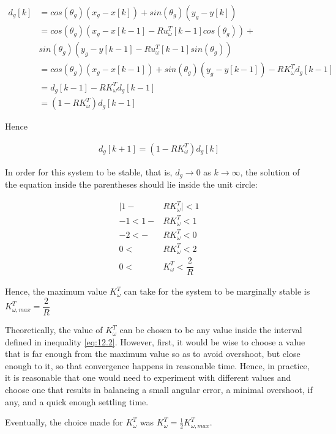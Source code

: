 \begin{align*}
  d_g[k] &= cos(\theta_g) (x_g - x[k]) + sin(\theta_g) (y_g - y[k]) \\
         &= cos(\theta_g) (x_g - x[k-1] - R u_{\omega}^T[k-1] cos(\theta_g)) + \\
         &  sin(\theta_g) (y_g - y[k-1] - R u_{\omega}^T[k-1] sin(\theta_g)) \\
         &= cos(\theta_g) (x_g - x[k-1]) + sin(\theta_g) (y_g - y[k-1]) -R K_{\omega}^T d_g[k-1]  \\
         &= d_g[k-1] - R K_{\omega}^T d_g[k-1]  \\
         &= (1-R K_{\omega}^T)d_g[k-1]
\end{align*}

Hence

\begin{align*}
  d_g[k+1]= (1-R K_{\omega}^T)d_g[k]
\end{align*}

In order for this system to be stable, that is, $d_g \to 0$ as $k \to \infty$,
the solution of the equation inside the parentheses should lie inside the unit
circle:

\begin{align}
  \Big|1 - &R K_{\omega}^T\Big| < 1 \nonumber \\
  -1 < 1 - &R K_{\omega}^T < 1 \nonumber \\
  -2 < - &R K_{\omega}^T < 0 \nonumber \\
   0 <\ &R K_{\omega}^T < 2 \nonumber \\
   0 <\ &K_{\omega}^T < \dfrac{2}{R} \label{eq:12.2}
\end{align}

Hence, the maximum value $K_{\omega}^T$ can take for the system to be marginally
stable is $K_{\omega,max}^T = \dfrac{2}{R}$

Theoretically, the value of $K_{\omega}^T$ can be chosen to be any value inside
the interval defined in inequality \ref{eq:12.2}. However, first, it would be
wise to choose a value that is far enough from the maximum value so as to avoid
overshoot, but close enough to it, so that convergence happens in reasonable
time. Hence, in practice, it is reasonable that one would need to experiment
with different values and choose one that results in balancing a small angular
error, a minimal overshoot, if any, and a quick enough settling time.

Eventually, the choice made for $K_{\omega}^T$ was
$K_{\omega}^T = \frac{1}{2} K_{\omega,max}^T$.

